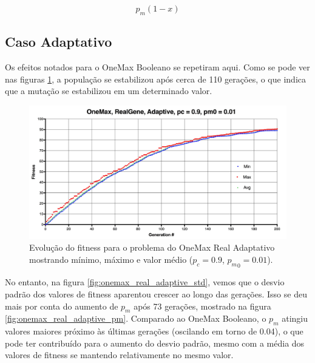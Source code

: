 \begin{equation}
	p_m(1-x)
\end{equation}

\subsection{Caso Adaptativo}

Os efeitos notados para o OneMax Booleano se repetiram aqui. Como se pode ver nas figuras \ref{fig:onemax_real_adaptive}, a população se estabilizou após cerca de 110 gerações, o que indica que a mutação se estabilizou em um determinado valor.

\begin{figure}[ht!]
    \centering \includegraphics[width=1.0\textwidth]{onemax_real_adaptive.jpg}
    \caption{Evolução do fitness para o problema do OneMax Real Adaptativo mostrando mínimo, máximo e valor médio ($p_c=0.9$, ${p_m}_0=0.01$).}
    \label{fig:onemax_real_adaptive}
\end{figure}

No entanto, na figura \ref{fig:onemax_real_adaptive_std}, vemos que o desvio padrão dos valores de fitness aparentou crescer ao longo das gerações. Isso se deu mais por conta do aumento de $p_m$ após 73 gerações, mostrado na figura \ref{fig:onemax_real_adaptive_pm}. Comparado ao OneMax Booleano, o $p_m$ atingiu valores maiores próximo às últimas gerações (oscilando em torno de 0.04), o que pode ter contribuído para o aumento do desvio padrão, mesmo com a média dos valores de fitness se mantendo relativamente no mesmo valor.

